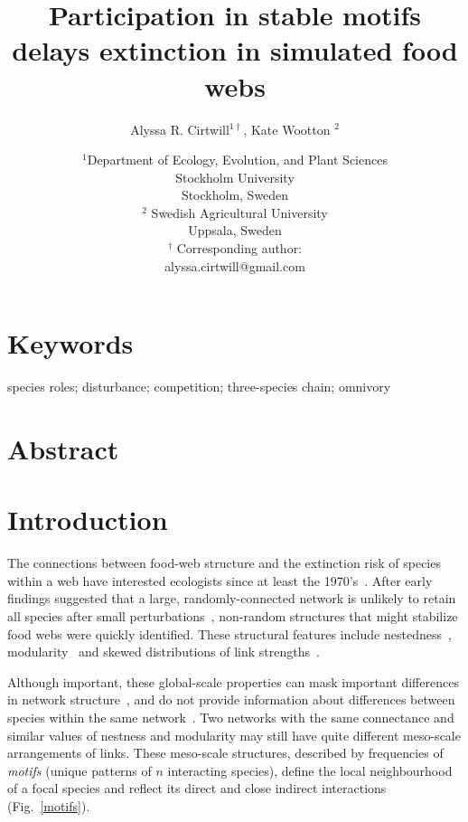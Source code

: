 \documentclass[12pt]{article}
\title{Participation in stable motifs delays extinction in simulated food webs}
\author{Alyssa R. Cirtwill$^{1\dagger}$, Kate Wootton $^{2}$}
\date{\small$^1$Department of Ecology, Evolution, and Plant Sciences\\ 
Stockholm University\\
Stockholm, Sweden\\
\medskip
\small$^2$ Swedish Agricultural University\\
Uppsala, Sweden\\
\medskip
$^\dagger$ Corresponding author:\\
alyssa.cirtwill@gmail.com\\
 }
\begin{document}
 
\maketitle 
\raggedright
\setlength{\parindent}{15pt} 


\section{Keywords}

	species roles; disturbance; competition; three-species chain; omnivory


\section{Abstract}


\section{Introduction}

	The connections between food-web structure and the extinction risk of species within a web have interested ecologists since at least the 1970's~\citep{May1972}. After early findings suggested that a large, randomly-connected network is unlikely to retain all species after small perturbations~\citep{Gardner1970,May1972}, non-random structures that might stabilize food webs were quickly identified. These structural features include nestedness~\citep{Allesina2012,Sauve2014}, modularity~\citep{Sauve2014,Thebault2010} and skewed distributions of link strengths~\citep{McCann1998,Gross2009,Rooney2012,Wootton2016}.
	
	
	Although important, these global-scale properties can mask important differences in  network structure~\citep{Simmons2019}, and do not provide information about differences between species within the same network~\citep{Cirtwill2018FoodWebs}. 
	Two networks with the same connectance and similar values of nestness and modularity may still have quite different meso-scale arrangements of links. 
	These meso-scale structures, described by frequencies of \emph{motifs} (unique patterns of $n$ interacting species), define the local neighbourhood of a focal species and reflect its direct and close indirect interactions (Fig.~\ref{motifs}).
	
\end{document}
